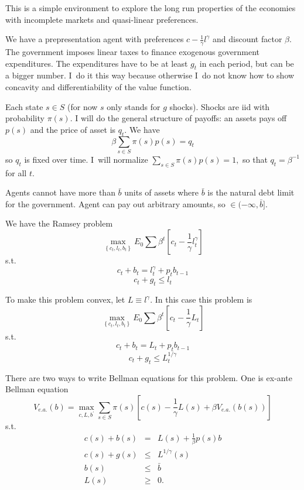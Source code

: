 \documentclass{article}
\begin{document}
This is a simple environment to explore the long run properties of the
economies with incomplete markets and quasi-linear preferences.

We have a prepresentation agent with preferences $c-\frac{1}{\gamma }%
l^{\gamma }$ and discount factor $\beta .$ The government imposes linear
taxes to finance exogenous government expenditures. The expenditures have to
be at least $g_{t}$ in each period, but can be a bigger number. I\ do it
this way because otherwise I\ do not know how to show concavity and
differentiability of the value function.

Each state $s\in S$ (for now $s$ only stands for $g$ shocks). Shocks are iid
with probability $\pi \left( s\right) .$ I will do the general structure of
payoffs: an assets pays off $p\left( s\right) $ and the price of asset is $%
q_{t}.$ We have 
\[
\beta \sum_{s\in S}\pi \left( s\right) p\left( s\right) =q_{t} 
\]%
so $q_{t}$ is fixed over time. I\ will normalize $\sum_{s\in S}\pi \left(
s\right) p\left( s\right) =1,$ so that $q_{t}=\beta ^{-1}$ for all $t.$

Agents cannot have more than $\bar{b}$ units of assets where $\bar{b}$ is
the natural debt limit for the government. Agent can pay out arbitrary
amounts, so $\in (-\infty ,\bar{b}].$

We have the Ramsey problem%
\[
\max_{\left\{ c_{t},l_{t},b_{t}\right\} }E_{0}\sum \beta ^{t}\left[ c_{t}-%
\frac{1}{\gamma }l_{t}^{\gamma }\right] 
\]%
s.t.%
\[
c_{t}+b_{t}=l_{t}^{\gamma }+p_{t}b_{t-1} 
\]%
\[
c_{t}+g_{t}\leq l_{t} 
\]

\smallskip To make this problem convex, let $L\equiv l^{\gamma }.$ In this
case this problem is 
\[
\max_{\left\{ c_{t},l_{t},b_{t}\right\} }E_{0}\sum \beta ^{t}\left[ c_{t}-%
\frac{1}{\gamma }L_{t}\right] 
\]%
s.t.%
\[
c_{t}+b_{t}=L_{t}+p_{t}b_{t-1} 
\]%
\[
c_{t}+g_{t}\leq L_{t}^{1/\gamma } 
\]

\smallskip There are two ways to write Bellman equations for this problem.
One is ex-ante Bellman equation 
\[
V_{e.a.}\left( b\right) =\max_{c,L,b^{\prime }}\sum_{s\in S}\pi \left(
s\right) \left[ c\left( s\right) -\frac{1}{\gamma }L\left( s\right) +\beta
V_{e.a.}\left( b\left( s\right) \right) \right] 
\]%
s.t.%
\begin{eqnarray*}
c\left( s\right) +b\left( s\right) &=&L\left( s\right) +\frac{1}{\beta }%
p\left( s\right) b \\
c\left( s\right) +g\left( s\right) &\leq &L^{1/\gamma }\left( s\right) \\
b\left( s\right) &\leq &\bar{b} \\
L\left( s\right) &\geq &0.
\end{eqnarray*}
\end{document}
